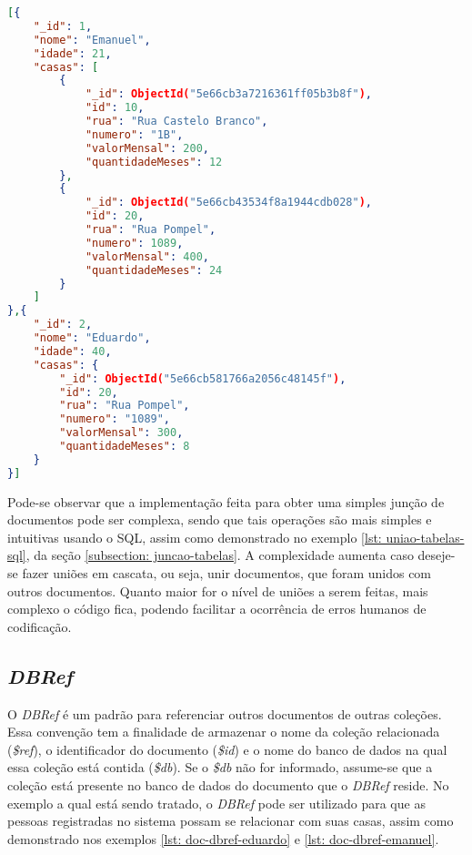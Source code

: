 
\begin{lstlisting}[language=json, caption={Resultado da Junção de Documentos sem Omissão\label{lst: resultado-juncao-lookup-sem-omissao}}]
[{
    "_id": 1,
    "nome": "Emanuel",
    "idade": 21,
    "casas": [
        {
            "_id": ObjectId("5e66cb3a7216361ff05b3b8f"),
            "id": 10,
            "rua": "Rua Castelo Branco",
            "numero": "1B",
            "valorMensal": 200,
            "quantidadeMeses": 12
        },
        {
            "_id": ObjectId("5e66cb43534f8a1944cdb028"),
            "id": 20,
            "rua": "Rua Pompel",
            "numero": 1089,
            "valorMensal": 400,
            "quantidadeMeses": 24
        }
    ]
},{
    "_id": 2,
    "nome": "Eduardo",
    "idade": 40,
    "casas": {
        "_id": ObjectId("5e66cb581766a2056c48145f"),
        "id": 20,
        "rua": "Rua Pompel",
        "numero": "1089",
        "valorMensal": 300,
        "quantidadeMeses": 8
    }
}]
\end{lstlisting}

Pode-se observar que a implementação feita para obter uma simples junção de documentos pode ser complexa, sendo que tais operações são mais simples e intuitivas usando o SQL, assim como demonstrado no exemplo \ref{lst: uniao-tabelas-sql}, da seção \ref{subsection: juncao-tabelas}. A complexidade aumenta caso deseje-se fazer uniões em cascata, ou seja, unir documentos, que foram unidos com outros documentos. Quanto maior for o nível de uniões a serem feitas, mais complexo o código fica, podendo facilitar a ocorrência de erros humanos de codificação.

\subsection{\textit{DBRef}}

O \textit{DBRef} é um padrão para referenciar outros documentos de outras coleções. Essa convenção tem a finalidade de armazenar o nome da coleção relacionada (\textit{\$ref}), o identificador do documento (\textit{\$id}) e o nome do banco de dados na qual essa coleção está contida (\textit{\$db}). Se o \textit{\$db} não for informado, assume-se que a coleção está presente no banco de dados do documento que o \textit{DBRef} reside. No exemplo a qual está sendo tratado, o \textit{DBRef} pode ser utilizado para que as pessoas registradas no sistema possam se relacionar com suas casas, assim como demonstrado nos exemplos \ref{lst: doc-dbref-eduardo} e \ref{lst: doc-dbref-emanuel}.

